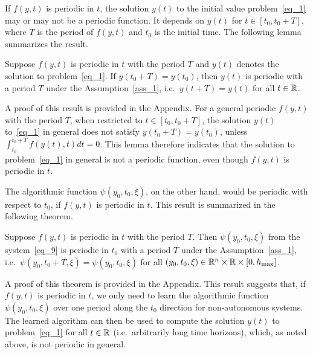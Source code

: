 If $f(y,t)$ is periodic in $t$, the solution $y(t)$ to the initial value
problem~\eqref{eq_1} may or may not be a
periodic function. It depends on $y(t)$ for
$t\in[t_0,t_0+T]$, where $T$ is the period of $f(y,t)$ and
$t_0$ is the initial time.
The following lemma summarizes the result.
\begin{lemma}\label{lem_1}
  Suppose $f(y,t)$ is periodic in $t$ with the period $T$
  and $y(t)$ denotes the solution
  to problem~\eqref{eq_1}.
  If $y(t_0+T)=y(t_0)$, then $y(t)$ is periodic with a period $T$
  under the Assumption~\ref{ass_1},
  i.e.~$y(t+T)=y(t)$ for all $t\in\mathbb{R}$.
\end{lemma}
\noindent A proof of this result is provided in the Appendix.
For a general periodic $f(y,t)$ with the period $T$, when
restricted to $t\in[t_0,t_0+T]$, the solution $y(t)$ to~\eqref{eq_1}
in general does not satisfy $y(t_0+T)=y(t_0)$, unless
$\int_{t_0}^{t_0+T}f(y(t),t)dt=0$.
This lemma therefore indicates that the solution to problem~\eqref{eq_1}
in general is not a periodic function, even though $f(y,t)$ is periodic in $t$.

The algorithmic function $\psi(y_0,t_0,\xi)$, on the other hand,
would be periodic with respect to $t_0$, if $f(y,t)$ is periodic in $t$.
This result is summarized in the following theorem.
\begin{theorem}\label{thm_a1}
  Suppose $f(y,t)$ is periodic in $t$ with the period $T$.
  Then $\psi(y_0,t_0,\xi)$ from the system~\eqref{eq_9} is
  periodic in $t_0$ with a period $T$ under the Assumption~\ref{ass_1},
  i.e.~$\psi(y_0,t_0+T,\xi)=\psi(y_0,t_0,\xi)$
  for all $(y_0,t_0,\xi)\in\mathbb{R}^n\times\mathbb{R}\times[0,h_{\max}]$.
\end{theorem}
\noindent A proof of this theorem is provided in the Appendix.
This result suggests that, if $f(y,t)$ is periodic in $t$,
we only need to learn the algorithmic function $\psi(y_0,t_0,\xi)$
over one period along the $t_0$ direction for non-autonomous systems.
The learned
algorithm can then be used to compute the solution $y(t)$
to problem~\eqref{eq_1} for all $t\in\mathbb{R}$ (i.e.~arbitrarily long time horizons),
which, as noted above, is not periodic in general.

